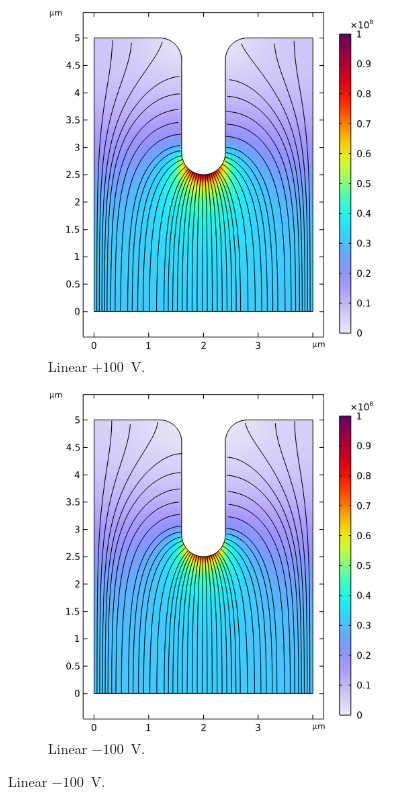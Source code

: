 \begin{refsection}
\begin{figure}[H]
    \centering
    \begin{subfigure}[b]{0.45\linewidth}
        \includegraphics[width=\linewidth]{Chapter7/Figs/Raster/Comsol/+100_normE_smol.png}
        \caption{Linear $+100$~\si{\volt}.}
        \label{fig:c_+100_lin_norme}
    \end{subfigure}
    \hfill %
    \begin{subfigure}[b]{0.45\linewidth}
        \includegraphics[width=\linewidth]{Chapter7/Figs/Raster/Comsol/-100_normE_smol.png}
        \caption{Linear $-100$~\si{\volt}.}
        \label{fig:c_-100_lin_norme}
    \end{subfigure}
    

\end{figure}
\end{refsection}
